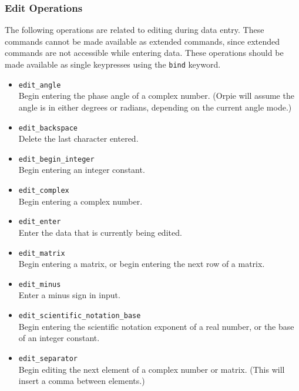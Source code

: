\documentclass[11pt,notitlepage]{article}
\begin{document}
\subsubsection{Edit Operations}
\label{edits}
The following operations are related to editing during data entry.  These
commands cannot be made available as extended commands, since extended
commands are not accessible while entering data.  These operations should
be made available as single keypresses using the {\tt bind} keyword.
\begin{itemize}
   \item {\tt edit\_angle} \\
      Begin entering the phase angle of a complex number.  (Orpie will
      assume the angle is in either degrees or radians, depending on
      the current angle mode.)
   \item {\tt edit\_backspace} \\
      Delete the last character entered.
   \item {\tt edit\_begin\_integer} \\
      Begin entering an integer constant.
   \item {\tt edit\_complex} \\
      Begin entering a complex number.
   \item {\tt edit\_enter} \\
      Enter the data that is currently being edited.
   \item {\tt edit\_matrix} \\
      Begin entering a matrix, or begin entering the next
      row of a matrix.
   \item {\tt edit\_minus} \\
      Enter a minus sign in input.
   \item {\tt edit\_scientific\_notation\_base} \\
      Begin entering the scientific notation exponent of a real number,
      or the base of an integer constant.
   \item {\tt edit\_separator} \\
      Begin editing the next element of a complex number or
      matrix.  (This will insert a comma between elements.)
\end{itemize}
\end{document}
